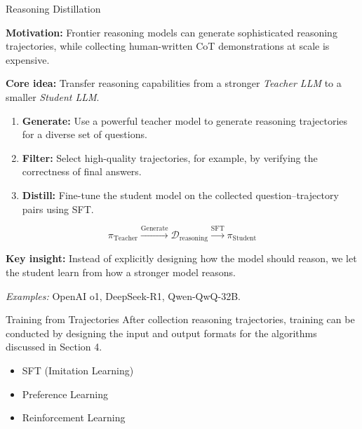 \documentclass[aspectratio=169]{beamer}
\begin{document}
\begin{frame}{Reasoning Distillation}

\textbf{Motivation:} Frontier reasoning models can generate sophisticated reasoning trajectories, while collecting human-written CoT demonstrations at scale is expensive.

\vspace{0.3cm}

\textbf{Core idea:} Transfer reasoning capabilities from a stronger \textit{Teacher LLM} to a smaller \textit{Student LLM}.

\begin{enumerate}
    \item \textbf{Generate:} Use a powerful teacher model to generate reasoning trajectories for a diverse set of questions.

    \item \textbf{Filter:} Select high-quality trajectories, for example, by verifying the correctness of final answers.

    \item \textbf{Distill:} Fine-tune the student model on the collected question--trajectory pairs using SFT.
\end{enumerate}

\[
\pi_{\mathrm{Teacher}}
\xrightarrow{\text{Generate}}
\mathcal{D}_{\mathrm{reasoning}}
\xrightarrow{\text{SFT}}
\pi_{\mathrm{Student}}
\]

\vspace{0.2cm}

\textbf{Key insight:} Instead of explicitly designing how the model should reason, we let the student learn from how a stronger model reasons.

\textit{Examples:} OpenAI o1, DeepSeek-R1, Qwen-QwQ-32B.

\end{frame}
\begin{frame}{Training from Trajectories}
After collection reasoning trajectories, training can be conducted by designing the input and output formats for the algorithms discussed in Section 4.
\begin{itemize}
    \item SFT (Imitation Learning)
    \item Preference Learning
    \item Reinforcement Learning
\end{itemize}
    
\end{frame}
\end{document}
